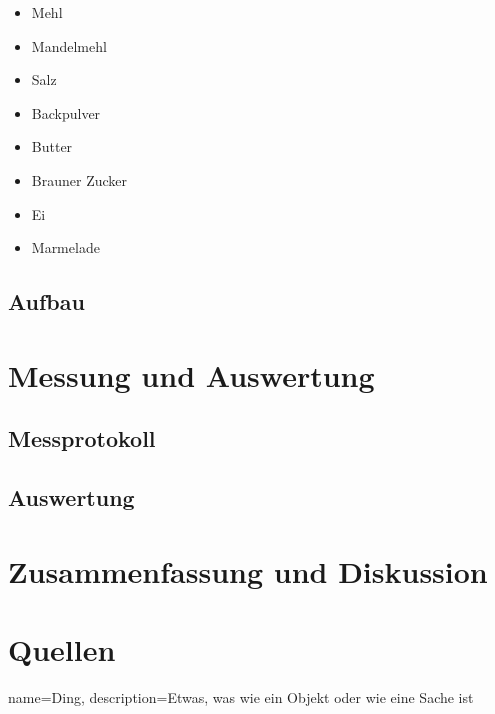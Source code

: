 \documentclass[a4paper,12pt]{article}
\begin{document}
    \begin{itemize}
        \item Mehl
        
        \item Mandelmehl
        
        \item Salz
        
        \item Backpulver
        
        \item Butter
        
        \item Brauner Zucker
        
        \item Ei
        
        \item Marmelade
    \end{itemize}
    
    \subsection{Aufbau}
    
\newpage    
    
\section{Messung und Auswertung}

    \subsection{Messprotokoll}
    
    \subsection{Auswertung}
    
\section{Zusammenfassung und Diskussion}

\section{Quellen}



{
    name=Ding,
    description={Etwas, was wie ein Objekt oder wie eine Sache ist}
}

\printglossaries
\end{document}
